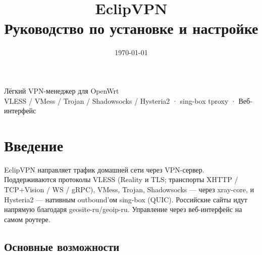 \documentclass[11pt,a4paper]{article}
\title{\vspace{2cm}\Huge\textbf{EclipVPN}\\[0.4em]\large\mdseries Руководство по установке и настройке}
\author{}
\date{\today}
\begin{document}
\maketitle
\thispagestyle{empty}
\vspace{1cm}

\begin{center}
\small Лёгкий VPN-менеджер для OpenWrt \\
VLESS / VMess / Trojan / Shadowsocks / Hysteria2 · sing-box tproxy · Веб-интерфейс
\end{center}

\vspace{2cm}
\tableofcontents
\thispagestyle{empty}
\newpage

\section{Введение}

EclipVPN направляет трафик домашней сети через VPN-сервер. Поддерживаются протоколы VLESS (Reality и TLS; транспорты XHTTP / TCP+Vision / WS / gRPC), VMess, Trojan, Shadowsocks — через xray-core, и Hysteria2 — нативным outbound'ом sing-box (QUIC). Российские сайты идут напрямую благодаря geosite-ru/geoip-ru. Управление через веб-интерфейс на самом роутере.

\subsection{Основные возможности}
\end{document}
